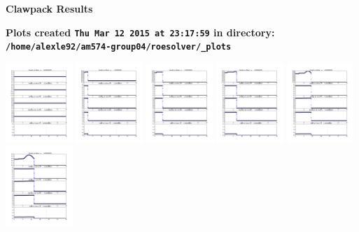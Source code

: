 \documentclass[11pt]{article}
\begin{document}
        \begin{center}{\Large\bf Clawpack Results}\vskip 5pt
        
        \bf Plots created {\tt Thu Mar 12 2015 at 23:17:59} in directory: \vskip 5pt
        \verb+/home/alexle92/am574-group04/roesolver/_plots+
        \end{center}
        \vskip 5pt
        \includegraphics[width=0.19\textwidth]{frame0000fig1.png}
\vskip 10pt 
\includegraphics[width=0.19\textwidth]{frame0001fig1.png}
\vskip 10pt 
\includegraphics[width=0.19\textwidth]{frame0002fig1.png}
\vskip 10pt 
\includegraphics[width=0.19\textwidth]{frame0003fig1.png}
\vskip 10pt 
\includegraphics[width=0.19\textwidth]{frame0004fig1.png}
\vskip 10pt 
\includegraphics[width=0.19\textwidth]{frame0005fig1.png}
\end{document}
